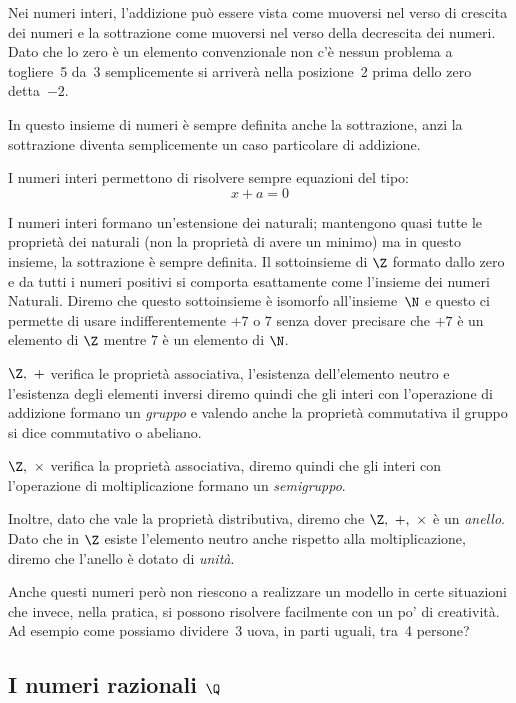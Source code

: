 Nei numeri interi, l'addizione può essere vista come muoversi nel verso 
di crescita dei numeri e la sottrazione come muoversi nel verso della 
decrescita dei numeri. Dato che lo zero è un elemento convenzionale non c'è 
nessun problema a togliere~5 da~3 semplicemente si arriverà nella 
posizione~2 prima dello zero detta~\(-2\).

In questo insieme di numeri è sempre definita anche la sottrazione, anzi la 
sottrazione diventa semplicemente un caso particolare di addizione.

I numeri interi permettono di risolvere sempre equazioni del tipo:
\[x+a=0\]

I numeri interi formano un'estensione dei naturali;
mantengono quasi tutte le proprietà dei naturali 
(non la proprietà di avere un minimo) ma in questo insieme, la sottrazione è 
sempre definita.
Il sottoinsieme di \(\Z\) formato dallo zero e da tutti i numeri positivi
si comporta esattamente come l'insieme dei numeri Naturali. Diremo che 
questo sottoinsieme è isomorfo all'insieme~\(\N\) 
e questo ci permette di usare indifferentemente \(+7\) o \(7\) 
senza dover precisare che \(+7\) è un elemento di \(\Z\) 
mentre \(7\) è un elemento di \(\N\).

\(\Z,~+\) verifica le proprietà associativa, l'esistenza dell'elemento 
neutro e l'esistenza degli elementi inversi diremo quindi che gli interi 
con l'operazione di addizione formano un \emph{gruppo} e valendo anche 
la proprietà commutativa il gruppo si dice commutativo o abeliano.

\(\Z,~\times\) verifica la proprietà associativa, diremo quindi che gli 
interi con l'operazione di moltiplicazione formano un \emph{semigruppo}.

Inoltre, dato che vale la proprietà distributiva, diremo che 
\(\Z,~+,~\times\) è un \emph{anello}. Dato che in \(\Z\) esiste l'elemento 
neutro anche rispetto alla moltiplicazione, diremo che l'anello è dotato di 
\emph{unità}.

Anche questi numeri però non riescono a realizzare un modello in certe 
situazioni che invece, nella pratica, si possono risolvere facilmente con un 
po' di creatività. Ad esempio come possiamo dividere~3 uova, in parti 
uguali, tra~4 persone?

\subsection{I numeri razionali \(\Q\)}
\label{subsec:insnum_razionali}

